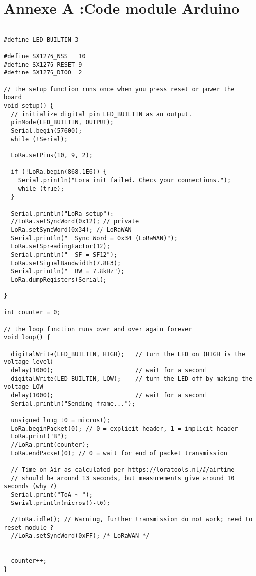\section{Annexe A :Code module Arduino}\label{codearduino}

\begin{lstlisting}[style=cppstyle, caption={Module Arduino}, label={lst:cpp}]

#define LED_BUILTIN 3

#define SX1276_NSS   10
#define SX1276_RESET 9
#define SX1276_DIO0  2

// the setup function runs once when you press reset or power the board
void setup() {
  // initialize digital pin LED_BUILTIN as an output.
  pinMode(LED_BUILTIN, OUTPUT);
  Serial.begin(57600);
  while (!Serial);

  LoRa.setPins(10, 9, 2);

  if (!LoRa.begin(868.1E6)) {
    Serial.println("Lora init failed. Check your connections.");
    while (true);
  }

  Serial.println("LoRa setup");
  //LoRa.setSyncWord(0x12); // private
  LoRa.setSyncWord(0x34); // LoRaWAN
  Serial.println("  Sync Word = 0x34 (LoRaWAN)");
  LoRa.setSpreadingFactor(12);
  Serial.println("  SF = SF12");
  LoRa.setSignalBandwidth(7.8E3);
  Serial.println("  BW = 7.8kHz");
  LoRa.dumpRegisters(Serial);

}

int counter = 0;

// the loop function runs over and over again forever
void loop() {

  digitalWrite(LED_BUILTIN, HIGH);   // turn the LED on (HIGH is the voltage level)
  delay(1000);                       // wait for a second
  digitalWrite(LED_BUILTIN, LOW);    // turn the LED off by making the voltage LOW
  delay(1000);                       // wait for a second
  Serial.println("Sending frame...");

  unsigned long t0 = micros();
  LoRa.beginPacket(0); // 0 = explicit header, 1 = implicit header
  LoRa.print("B");
  //LoRa.print(counter);
  LoRa.endPacket(0); // 0 = wait for end of packet transmission

  // Time on Air as calculated per https://loratools.nl/#/airtime
  // should be around 13 seconds, but measurements give around 10 seconds (why ?)
  Serial.print("ToA ~ ");
  Serial.println(micros()-t0);

  //LoRa.idle(); // Warning, further transmission do not work; need to reset module ?
  //LoRa.setSyncWord(0xFF); /* LoRaWAN */


  counter++;
}
\end{lstlisting}

